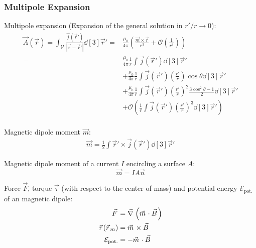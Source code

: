 		\subsubsection{Multipole Expansion}
			\noindent
			Multipole expansion (Expansion of the general solution in $r'/r \to 0$):
			\begin{equation}
				\begin{aligned}
					\vec{A}(\vec{r}) = \int_{\mathcal{V}} \frac{\vec{j}(\vec{r}')}{\left|\vec{r}-\vec{r}'\right|} \dd[3]{\vec{r}'}
					=& \frac{\mu_0}{4\pi} \left(\frac{\vec{m}\times\vec{r}}{r^3} + \mathcal{O}\left(\frac{1}{r^3}\right)\right) \\
					=& \frac{\mu_0}{4\pi}\frac{1}{r}\int\vec{j}(\vec{r}')\dd[3]{\vec{r}'} \\
					&+ \frac{\mu_0}{4\pi}\frac{1}{r}\int\vec{j}(\vec{r}')\left(\frac{r'}{r}\right)\cos\theta\dd[3]{\vec{r}'} \\
					&+ \frac{\mu_0}{4\pi}\frac{1}{r}\int\vec{j}(\vec{r}')\left(\frac{r'}{r}\right)^2\frac{3\cos^2\theta-1}{2}\dd[3]{\vec{r}'} \\
					&+ \mathcal{O}\left(\frac{1}{r}\int\vec{j}(\vec{r}')\left(\frac{r'}{r}\right)^3 \dd[3]{\vec{r}'}\right) \\
				\end{aligned}
			\end{equation}

			\noindent
			Magnetic dipole moment $\vec{m}$:
			\begin{equation}
				\begin{aligned}
					\vec{m} = \frac{1}{2}\int \vec{r}'\times\vec{j}(\vec{r}') \dd[3]{\vec{r}'}
				\end{aligned}
			\end{equation}

			\noindent
			Magnetic dipole moment of a current $I$ encircling a surface $A$:
			\begin{equation}
				\vec{m} = IA\vec{n}
			\end{equation}


			\noindent
			Force $\vec{F}$, torque $\vec{\tau}$ (with respect to the center of mass) and potential energy $\mathcal{E}_\text{pot.}$ of an magnetic dipole:
			\begin{equation}
				\begin{aligned}
					\vec{F} &= \Nabla\left(\vec{m}\cdot\vec{B}\right) \\
					\vec{\tau}(\vec{r}_m) &= \vec{m}\times\vec{B} \\
					\mathcal{E}_\text{pot.} &= -\vec{m}\cdot\vec{B} \\
				\end{aligned}
				\label{Eq:MagneticDipoleInteraction}
			\end{equation}

